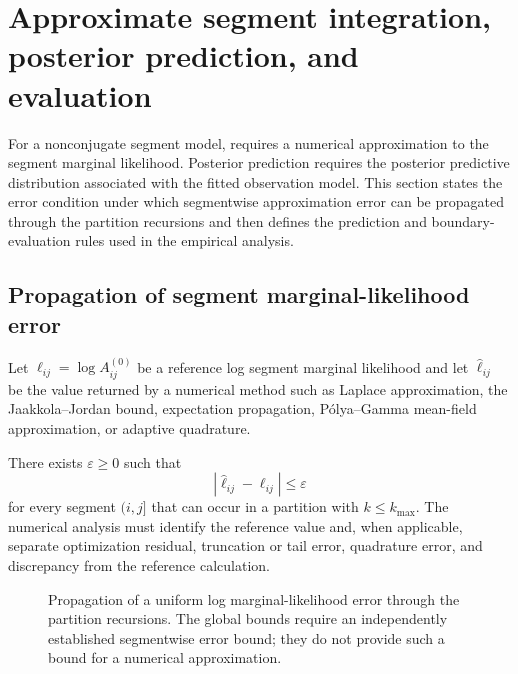 \section{Approximate segment integration, posterior prediction, and evaluation}
\label{sec:approx-predict}

For a nonconjugate segment model, \BayesBreak requires a numerical approximation to the segment marginal likelihood. Posterior prediction requires the posterior predictive distribution associated with the fitted observation model. This section states the error condition under which segmentwise approximation error can be propagated through the partition recursions and then defines the prediction and boundary-evaluation rules used in the empirical analysis.

\subsection{Propagation of segment marginal-likelihood error}
Let $\ell_{ij}=\log A^{(0)}_{ij}$ be a reference log segment marginal likelihood and let $\widehat\ell_{ij}$ be the value returned by a numerical method such as Laplace approximation, the Jaakkola--Jordan bound, expectation propagation, P\'olya--Gamma mean-field approximation, or adaptive quadrature.

\begin{assumption}
\label{ass:block-error}
There exists $\varepsilon\ge0$ such that
\begin{equation}
 |\widehat\ell_{ij}-\ell_{ij}|\le\varepsilon
\label{eq:block-error}
\end{equation}
for every segment $(i,j]$ that can occur in a partition with $k\le k_{\max}$. The numerical analysis must identify the reference value and, when applicable, separate optimization residual, truncation or tail error, quadrature error, and discrepancy from the reference calculation.
\end{assumption}

\begin{figure}[t]
  \centering
  \resizebox{0.91\textwidth}{!}{}
  \caption{Propagation of a uniform log marginal-likelihood error through the partition recursions. The global bounds require an independently established segmentwise error bound; they do not provide such a bound for a numerical approximation.}
  \label{fig:stability-chain-paper}
\end{figure}

